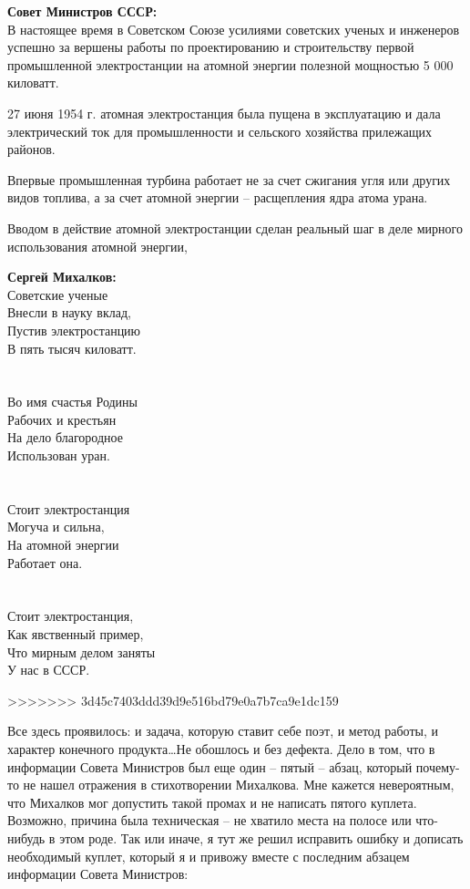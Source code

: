 \documentclass{book}
\begin{document}
\begin{minipage}{0.4\textwidth}
  \textbf{Совет Министров СССР:}\\
  В настоящее время в Советском Союзе усилиями советских ученых и инженеров успешно за вершены работы по проектированию и строительству первой промышленной электростанции на атомной энергии полезной мощностью 5 000 киловатт.
  
  27 июня 1954 г. атомная электростанция была пущена в эксплуатацию и дала электрический ток для промышленности и сельского
  хозяйства прилежащих районов.
  
  Впервые промышленная турбина работает не за счет сжигания угля или других видов топлива, а за счет атомной энергии -- расщепления ядра атома урана. 
  
  Вводом в действие атомной электростанции сделан реальный шаг  в деле мирного использования атомной энергии, 
\end{minipage}
\hfill
\begin{minipage}{0.4\textwidth}
  \textbf{Сергей Михалков:}\\
  Советские ученые \\
  Внесли в науку вклад, \\
  Пустив электростанцию \\
  В пять тысяч киловатт. \\
  \\ \\
  Во имя счастья Родины \\
  Рабочих и крестьян \\
  На дело благородное \\
  Использован уран. \\
  \\  \\
  Стоит электростанция \\
  Могуча и сильна, \\
  На атомной энергии \\
  Работает она. \\
  \\  \\  
  Стоит электростанция, \\
  Как явственный пример, \\
  Что мирным делом заняты \\
  У нас в СССР.
\end{minipage}
>>>>>>> 3d45c7403ddd39d9e516bd79e0a7b7ca9e1dc159

Все здесь проявилось: и задача, которую ставит себе поэт, и метод работы, и характер конечного продукта\ldots Не обошлось и без 
дефекта. Дело в том, что в информации Совета Министров был еще один -- пятый -- абзац, который почему-то не нашел отражения в 
стихотворении Михалкова. Мне кажется невероятным, что Михалков мог допустить такой промах и не написать пятого куплета. 
Возможно, причина была техническая -- не хватило места на полосе или что-нибудь в этом роде. Так или иначе, я тут же решил 
исправить ошибку и дописать необходимый куплет, который я и привожу вместе с последним абзацем информации Совета Министров:
\end{document}
